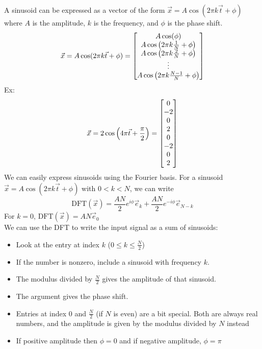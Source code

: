 \documentclass[11pt, fleqn]{article}
\begin{document}
A sinusoid can be expressed as a vector of the form $\vec{x}=A\cos(2\pi k\vec{t}+\phi)$ where $A$ is the amplitude, $k$ is the frequency, and $\phi$ is the phase shift.
$$\vec{x}=A\cos(2\pi k \vec{t}+\phi)=\matrixx{A\cos(\phi)\\ A\cos\brround{2\pi k\frac{1}{N}+\phi}\\ A\cos\brround{2\pi k\frac{2}{N} + \phi}\\ \vdots\\ A\cos\brround{2\pi k\frac{N-1}{N}+\phi}}$$
Ex:
\[ \vec{x}=2\cos\brround{4\pi \vec{t}+\frac{\pi}{2}}=\matrixx{0\\-2\\0\\2\\0\\-2\\0\\2} \]
We can easily express sinusoids using the Fourier basis. For a sinusoid $\vec{x}=A\cos(2\pi k\vec{t}+\phi)$ with $0<k<N$, we can write
$$\mathrm{DFT}(\vec{x})=\frac{AN}{2}e^{i\phi}\vec{e}_k+\frac{AN}{2}e^{-i\phi}\vec{e}_{N-k}$$
For $k=0$, $\mathrm{DFT}(\vec{x})=AN\vec{e}_0$\\
We can use the DFT to write the input signal as a sum of sinusoids:
\begin{itemize}
    \item Look at the entry at index $k$ ($0\leq k\leq \frac{N}{2}$)
    \item If the number is nonzero, include a sinusoid with frequency $k$.
    \item The modulus divided by $\frac{N}{2}$ gives the amplitude of that sinusoid.
    \item The argument gives the phase shift.
    \item Entries at index 0 and $\frac{N}{2}$ (if $N$ is even) are a bit special. Both are always real numbers, and the amplitude is given by the modulus divided by $N$ instead
    \item If positive amplitude then $\phi=0$ and if negative amplitude, $\phi=\pi$
\end{itemize}
\end{document}
